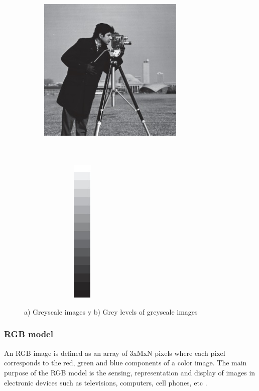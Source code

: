 \begin{figure}
	\begin{subfigure}{6cm}
		\centering    
    	\includegraphics[width=7cm,height=9cm,keepaspectratio]{images/ch2/grayScaleImage.jpg}
    \end{subfigure}
  	\begin{subfigure}{6cm}
  		\centering
  		\includegraphics[width=4cm,height=7cm,keepaspectratio]{images/ch2/grayLevelImage.jpg}
   
  	\end{subfigure}
  	\centering\caption{a) Greyscale images y b) Grey levels of greyscale images}
  	\label{fig:grayScaleImage}
\end{figure}

\subsubsection{RGB model}
An RGB image is defined as an array of 3xMxN pixels where each pixel corresponds to the red, green and blue components of a color image. The main purpose of the RGB model is the sensing, representation and display of images in electronic devices such as televisions, computers, cell phones, etc \cite{dip3}.

